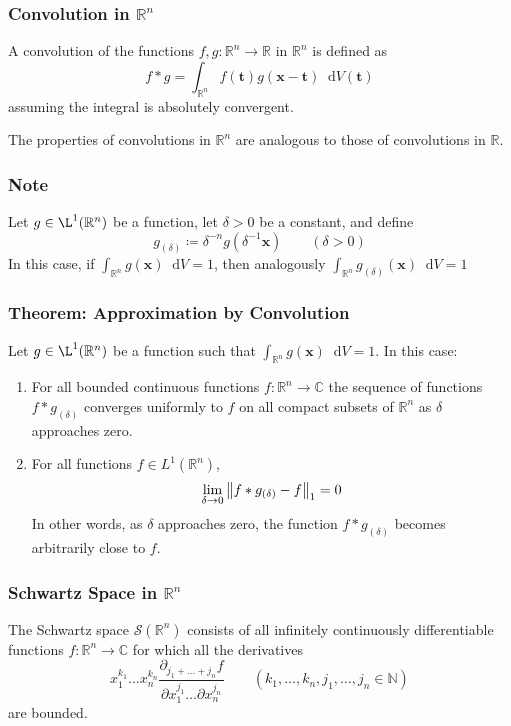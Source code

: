 \documentclass[11pt, a4paper]{article}
\newcommand{\diff}{\mathop{}\!\mathrm{d}} %
\newcommand{\R}{\mathbb{R}} %
\newcommand{\C}{\mathbb{C}} %
\begin{document}
\subsubsection{Convolution in $ \R^n $}
A convolution of the functions $ f, g:  \R^n \to \R $ in $ \R^n $ is defined as
\begin{equation*}
	f*g = \int_{\R^n} f(\bm{t})g(\bm{x} - \bm{t}) \diff V(\bm{t})
\end{equation*}
assuming the integral is absolutely convergent.

The properties of convolutions in $ \R^n $ are analogous to those of convolutions in $ \R $. 

\subsubsection{Note}
Let $ g\in \L^{1}(\R^n) $ be a function, let $ \delta > 0 $ be a constant, and define
\begin{equation*}
	g_{(\delta)} \coloneqq \delta^{-n}g(\delta^{-1}\bm{x}) \qquad (\delta > 0)
\end{equation*}
In this case, if $ \displaystyle{\int_{\R^n} g(\bm{x}) \diff V = 1} $, then analogously $ \displaystyle{\int_{\R^n} g_{(\delta)}(\bm{x}) \diff V = 1} $

\subsubsection{Theorem: Approximation by Convolution}
Let $ g\in \L^{1}(\R^n) $ be a function such that $ \displaystyle{\int_{\R^n} g(\bm{x}) \diff V = 1} $. In this case:
\begin{enumerate}
	\item For all bounded continuous functions $ f : \R^n \to \C $ the sequence of functions $ f * g_{(\delta)} $ converges uniformly to $ f $ on all compact subsets of $ \R^n $ as $ \delta $ approaches zero.

	\item For all functions $ f \in L^{1}(\R^n) $, 
	\begin{equation*}
		\lim_{\delta \to 0} \norm{f*g_{(\delta)} - f}_{1} = 0
	\end{equation*}
	In other words, as $ \delta $ approaches zero, the function $ f*g_{(\delta)} $ becomes arbitrarily close to $ f $.
\end{enumerate}

\subsubsection{Schwartz Space in $ \R^n $}
The Schwartz space $ \mathcal{S}(\R^n) $ consists of all infinitely continuously differentiable functions $ f: \R^n \to \C $ for which all the derivatives
\begin{equation*}
	x_{1}^{k_1} \dots x_{n}^{k_n} \frac{\partial_{j_1 + \dots + j_n} f}{\partial x_{1}^{j_1} \dots \partial x_n^{j_n}} \qquad (k_1, \dots, k_n, j_1, \dots, j_n \in \mathbb{N})
\end{equation*}
are bounded.
\end{document}
